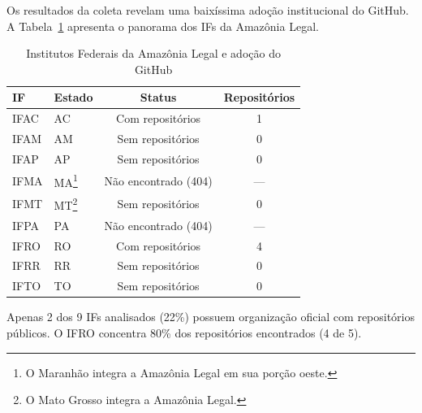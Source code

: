 \documentclass[english, spanish, brazilian]{RBIEarticle}
\begin{document}
Os resultados da coleta revelam uma baixíssima adoção institucional do GitHub. A Tabela~\ref{tab:resultados} apresenta o panorama dos IFs da Amazônia Legal.

\begin{table}[!htb]
	\centering
	\caption{Institutos Federais da Amazônia Legal e adoção do GitHub}
	\label{tab:resultados}
	\begin{tabular}{|l|l|c|c|}
		\hline
		\textbf{IF} & \textbf{Estado} & \textbf{Status} & \textbf{Repositórios} \\
		\hline
		IFAC & AC & Com repositórios & 1 \\
		IFAM & AM & Sem repositórios & 0 \\
		IFAP & AP & Sem repositórios & 0 \\
		IFMA & MA\footnote{O Maranhão integra a Amazônia Legal em sua porção oeste.} & Não encontrado (404) & — \\
		IFMT & MT\footnote{O Mato Grosso integra a Amazônia Legal.} & Sem repositórios & 0 \\
		IFPA & PA & Não encontrado (404) & — \\
		IFRO & RO & Com repositórios & 4 \\
		IFRR & RR & Sem repositórios & 0 \\
		IFTO & TO & Sem repositórios & 0 \\
		\hline
	\end{tabular}
\end{table}

Apenas 2 dos 9 IFs analisados (22\%) possuem organização oficial com repositórios públicos. O IFRO concentra 80\% dos repositórios encontrados (4 de 5).

%
%
\end{document}
